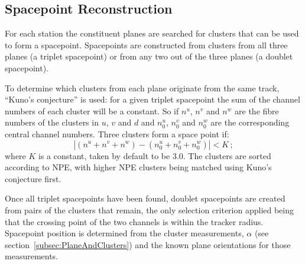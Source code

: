   \subsection{Spacepoint Reconstruction}
  \label{subsec:SpacepointReconstruction}
  For each station the constituent planes are searched for clusters that can be used to form a spacepoint. Spacepoints are constructed from clusters from all three planes (a triplet spacepoint) or from any two out of the three planes (a doublet spacepoint). 

  To determine which clusters from each plane originate from the same track, ``Kuno's conjecture'' is used: for a given triplet spacepoint the sum of the channel numbers of each cluster will be a constant.  So if $n^u$, $n^v$ and $n^w$ are the fibre numbers of the clusters in $u$, $v$ and $d$ and $n^u_0$, $n^v_0$ and $n^w_0$ are the corresponding central channel numbers. Three clusters form a space point if:
  \begin{equation}
    | (n^u + n^v + n^w) - (n^u_0 + n^v_0 + n^w_0) | < K \, ;
  \end{equation}
  where $K$ is a constant, taken by default to be 3.0. The clusters are sorted according to NPE, with higher NPE clusters being matched using Kuno's conjecture first. 
  
  Once all triplet spacepoints have been found, doublet spacepoints are created from pairs of the clusters that remain, the only selection criterion applied being that the crossing point of the two channels is within the tracker radius. Spacepoint position is determined from the cluster measurements, $\alpha$ (see section~\ref{subsec:PlaneAndClusters}) and the known plane orientations for those measurements. %


%   

